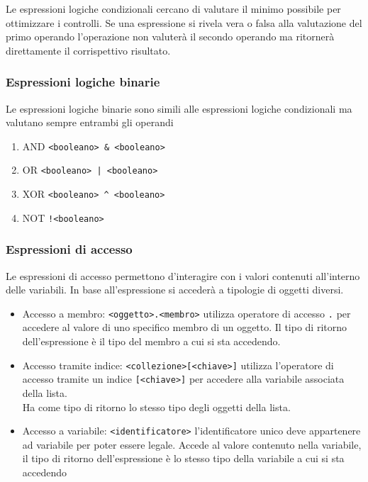 Le espressioni logiche condizionali cercano di valutare il minimo possibile per ottimizzare i controlli.
Se una espressione si rivela vera o falsa alla valutazione del primo operando l'operazione non 
valuterà il secondo operando ma ritornerà direttamente il corrispettivo risultato.

\subsubsection{Espressioni logiche binarie}
Le espressioni logiche binarie sono simili alle espressioni logiche condizionali ma valutano sempre
entrambi gli operandi
\begin{enumerate}
    \item AND \lstinline|<booleano> & <booleano>|
    \item OR \lstinline=<booleano> | <booleano>=
    \item XOR \lstinline|<booleano> ^ <booleano>|
    \item NOT \lstinline|!<booleano>|
\end{enumerate}

\subsubsection{Espressioni di accesso}
Le espressioni di accesso permettono d'interagire con i valori contenuti all'interno delle variabili.
In base all'espressione si accederà a tipologie di oggetti diversi.

\begin{itemize}
    \item 
    {
        Accesso a membro: \lstinline|<oggetto>.<membro>| utilizza operatore di accesso \lstinline|.| per accedere
        al valore di uno specifico membro di un oggetto.
        Il tipo di ritorno dell'espressione è il tipo del membro a cui si sta accedendo.
    }
    \item 
    {
        Accesso tramite indice: \lstinline|<collezione>[<chiave>]| utilizza l'operatore di accesso tramite un indice
        \lstinline|[<chiave>]| per accedere alla variabile associata della lista. \\
        Ha come tipo di ritorno lo stesso tipo degli oggetti della lista.
    }
    \item 
    {
        Accesso a variabile: \lstinline|<identificatore>| l'identificatore unico deve appartenere ad variabile
        per poter essere legale. Accede al valore contenuto nella variabile, il tipo di ritorno dell'espressione
        è lo stesso tipo della variabile a cui si sta accedendo
    }
\end{itemize}

